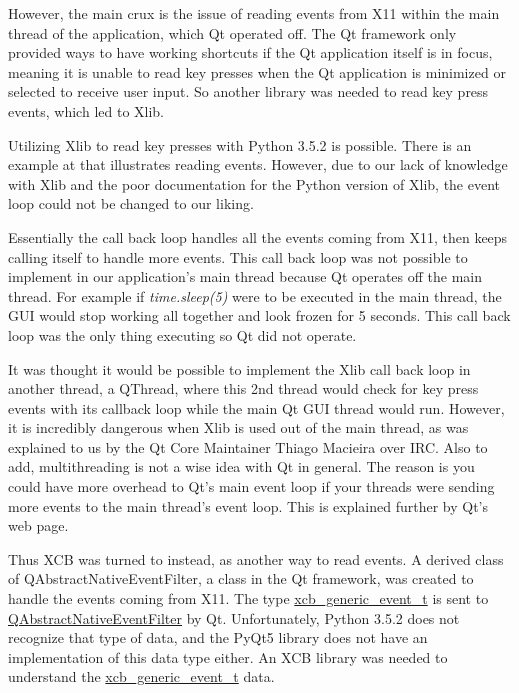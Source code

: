 \documentclass[12pt]{article}
\begin{document}
However, the main crux is the issue of reading events from X11 within the main thread of the application, which Qt operated off.
The Qt framework only provided ways to have working shortcuts if the Qt application itself is in focus, meaning it is unable to read key presses when the Qt application is minimized or selected to receive user input.
So another library was needed to read key press events, which led to Xlib.

Utilizing Xlib to read key presses with Python 3.5.2 is possible.
There is an example at  that illustrates reading events.
However, due to our lack of knowledge with Xlib and the poor documentation \cite{badDocumentation} for the Python version of Xlib, the event loop could not be changed to our liking.

Essentially the call back loop handles all the events coming from X11, then keeps calling itself to handle more events.
This call back loop was not possible to implement in our application's main thread because Qt operates off the main thread.
For example if \emph{time.sleep(5)} were to be executed in the main thread, the GUI would stop working all together and look frozen for 5 seconds.
This call back loop was the only thing executing so Qt did not operate.

It was thought it would be possible to implement the Xlib call back loop in another thread, a QThread, where this 2nd thread would check for key press events with its callback loop while the main Qt GUI thread would run.
However, it is incredibly dangerous when Xlib is used out of the main thread, as was explained to us by the Qt Core Maintainer Thiago Macieira over IRC.
Also to add, multithreading is not a wise idea with Qt in general.
The reason is you could have more overhead to Qt's main event loop if your threads were sending more events to the main thread's event loop. This is explained further by Qt's web page\cite{QtThreading}.

Thus XCB was turned to instead, as another way to read events.
A derived class of QAbstractNativeEventFilter, a class in the Qt framework, was created to handle the events coming from X11.
The type \url{xcb_generic_event_t} is sent to \url{QAbstractNativeEventFilter} by Qt.
Unfortunately, Python 3.5.2 does not recognize that type of data, and the PyQt5 library does not have an implementation of this data type either.
An XCB library was needed to understand the \url{xcb_generic_event_t} data.
\end{document}
